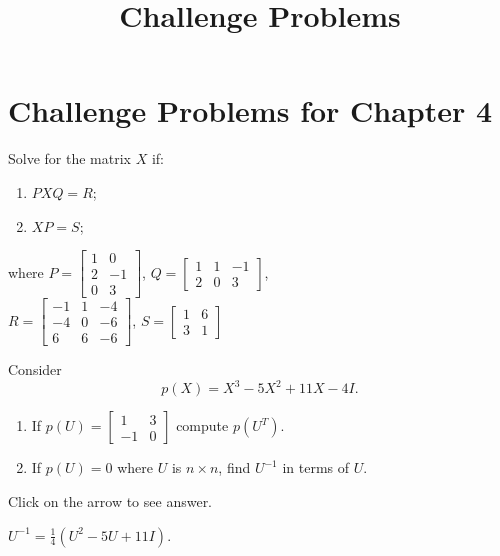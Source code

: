 \documentclass{ximera}
\title{Challenge Problems} \license{CC BY-NC-SA 4.0}
\begin{document}
\begin{abstract}
\end{abstract}
\maketitle

\section*{Challenge Problems for Chapter 4}

\begin{problem}\label{prob:4.75}
Solve for the matrix $X$ if:
\begin{enumerate}
\item $PXQ = R$;
\item $XP = S$;
\end{enumerate}
where
$
P = \left[ \begin{array}{rr}
1 & 0 \\
2 & -1 \\
0 & 3
\end{array} \right]$, $
Q = \left[ \begin{array}{rrr}
1 & 1 & -1 \\
2 & 0 & 3
\end{array} \right]$, \\ $
R = \left[ \begin{array}{rrr}
-1 & 1 & -4 \\
-4 & 0 & -6 \\
6 & 6 & -6
\end{array} \right]$, $
S = \left[ \begin{array}{rr}
1 & 6\\
3 & 1
\end{array} \right]$
\end{problem}

\begin{problem}\label{prob:4.76}
Consider \begin{equation*}
p(X) = X^{3} - 5X^{2} + 11X - 4I.
\end{equation*}

\begin{enumerate}
\item If $p(U) = \left[ \begin{array}{rr}
1 & 3 \\
-1 & 0
\end{array} \right]$
 compute $p(U^{T})$.

\item If $p(U) = 0$ where $U$ is $n \times n$, find $U^{-1}$ in terms of $U$.
\end{enumerate}

Click on the arrow to see answer.
\begin{expandable}{}{}
 $U^{-1} = \frac{1}{4}(U^{2} - 5U + 11I)$.
\end{expandable}
\end{problem}
\end{document}
